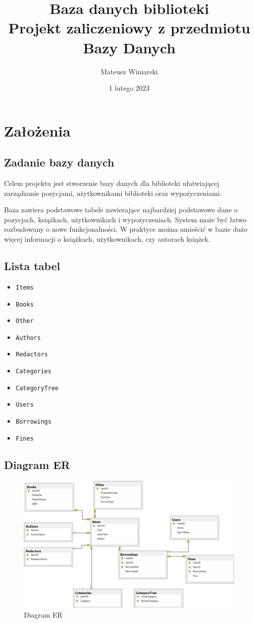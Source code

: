 \documentclass{article}
\title{Baza danych biblioteki\\\large Projekt zaliczeniowy z przedmiotu Bazy Danych}
\author{Mateusz Winiarski}
\date{1 lutego 2023}
\renewcommand\t\texttt
\begin{document}
\maketitle

\section{Założenia}

\subsection{Zadanie bazy danych}
Celem projektu jest stworzenie bazy danych dla biblioteki ułatwiającej zarządzanie pozycjami, użytkownikami biblioteki oraz wypożyczeniami. 

Baza zawiera podstawowe tabele zawierające najbardziej podstawowe dane o pozycjach, książkach, użytkownikach i wypożyczeniach. System może być łatwo rozbudowany o nowe funkcjonalności. W praktyce można umieścić w bazie dużo więcej informacji o książkach, użytkownikach, czy autorach książek.


\subsection{Lista tabel}

\begin{itemize}
    \item \t{Items}
    \item \t{Books}
    \item \t{Other}
    \item \t{Authors}
    \item \t{Redactors}
    \item \t{Categories}
    \item \t{CategoryTree}
    \item \t{Users}
    \item \t{Borrowings}
    \item \t{Fines}
\end{itemize}

\subsection{Diagram ER}

\begin{figure}[H]
    \centering
    \includegraphics[width=\textwidth]{diergram.png}
    \caption{Diagram ER}
    \label{er}
\end{figure}
\end{document}
